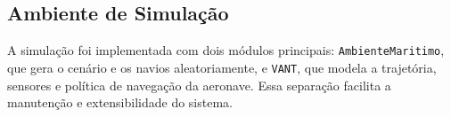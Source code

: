 



\subsection{Ambiente de Simulação}

A simulação foi implementada com dois módulos principais: \texttt{AmbienteMaritimo}, que gera o cenário e os navios aleatoriamente, e \texttt{VANT}, que modela a trajetória, sensores e política de navegação da aeronave. Essa separação facilita a manutenção e extensibilidade do sistema.

